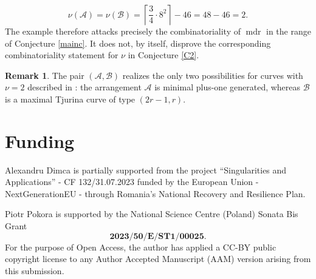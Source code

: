 \documentclass[11pt]{amsart}
\newcommand{\cA}{\mathcal A}
\newcommand{\cB}{\mathcal B}
\newcommand{\mdr}{\operatorname{mdr}}
\theoremstyle{plain}
\theoremstyle{definition}
\newtheorem{remark}[theorem]{Remark}
\numberwithin{equation}{section}
\begin{document}
\[
\nu(\cA)=\nu(\cB)=\left\lceil \frac34\cdot 8^2\right\rceil-46=48-46=2.
\]
The example therefore attacks precisely the combinatoriality of \(\mdr\) in the range of Conjecture \ref{mainc}.  It does not, by itself, disprove the corresponding combinatoriality statement for \(\nu\)  in Conjecture \ref{C2}.
\begin{remark}
The pair \((\mathcal A,\mathcal B)\) realizes the only two possibilities for curves
with \(\nu=2\) described in \cite[Remark~1.6]{mpog}: the arrangement
\(\mathcal A\) is minimal plus-one generated, whereas \(\mathcal B\) is a
maximal Tjurina curve of type \((2r-1,r)\).
\end{remark}

\section*{Funding}
Alexandru Dimca is partially supported from the project ``Singularities and Applications'' - CF 132/31.07.2023 funded by the European Union - NextGenerationEU - through Romania's National Recovery and Resilience Plan.

Piotr Pokora is supported by the National Science Centre (Poland) Sonata Bis Grant 
\[\textbf{2023/50/E/ST1/00025.} \] For the purpose of Open Access, the author has applied a CC-BY public copyright license to any Author Accepted Manuscript (AAM) version arising from this submission.
\end{document}
